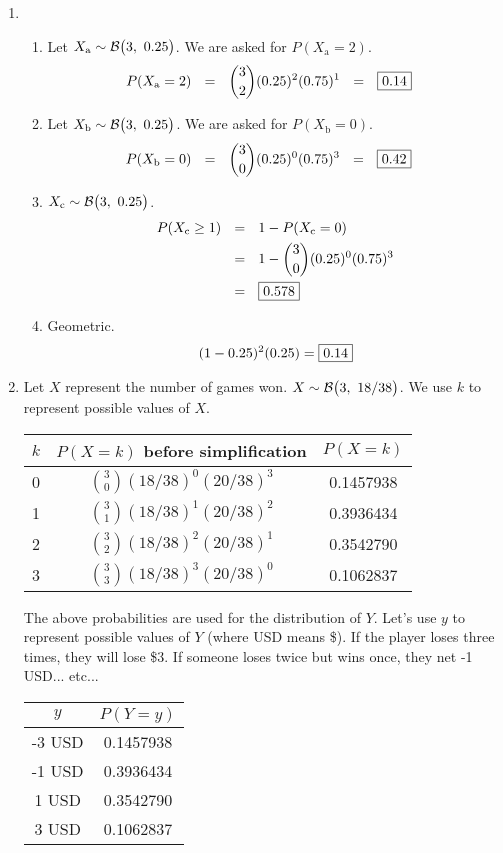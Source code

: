 \documentclass[12pt,letterpaper]{article}
\begin{document}
\begin{enumerate}
\newpage

\item \begin{enumerate}
\item Let $X_\text{a} \sim \mathcal{B}\big(3,~0.25\big)$. We are asked for $P(X_\text{a} = 2)$.
\begin{align*}
P(X_\text{a} = 2) ~~&=~~ {3\choose 2}(0.25)^2(0.75)^{1} ~~=~~ \fbox{0.14}
\end{align*}
\item Let $X_\text{b} \sim \mathcal{B}\big(3,~0.25\big)$. We are asked for $P(X_\text{b} = 0)$.
\begin{align*}
P(X_\text{b} = 0) ~~&=~~ {3\choose 0}(0.25)^0(0.75)^{3} ~~=~~ \fbox{0.42}
\end{align*}
\item $X_\text{c} \sim \mathcal{B}\big(3,~0.25\big)$. 
\begin{align*}
P(X_\text{c} \ge 1) ~~&=~~ 1-P(X_\text{c} = 0) \\
&=~~ 1-{3\choose 0}(0.25)^0(0.75)^{3} \\
&=~~ \fbox{0.578}
\end{align*}
\item Geometric.
$$(1-0.25)^2(0.25) = \fbox{0.14} $$
\end{enumerate}


\item Let $X$ represent the number of games won. $X\sim \mathcal{B}\big(3,~18/38\big)$. We use $k$ to represent possible values of $X$.
\begin{center}
\renewcommand{\arraystretch}{1.8}
\begin{tabular}{|c|c|c|}\hline
$k$ & $P(X=k)$ before simplification & $P(X=k)$ \\ \hline
0  & ${3\choose 0} (18/38)^{0} (20/38)^3$ &  0.1457938 \\
1  & ${3\choose 1} (18/38)^{1} (20/38)^2$ & 0.3936434  \\
2  & ${3\choose 2} (18/38)^{2} (20/38)^1$ &  0.3542790 \\
3  & ${3\choose 3} (18/38)^{3} (20/38)^0$ &  0.1062837 \\ \hline
\end{tabular}
\end{center}
The above probabilities are used for the distribution of $Y$. Let's use $y$ to represent possible values of $Y$ (where USD means \$). If the player loses three times, they will lose \$3. If someone loses twice but wins once, they net -1 USD... etc...
\begin{center}
\renewcommand{\arraystretch}{1.8}
\begin{tabular}{|c|c|}\hline
$y$ & $P(Y=y)$ \\ \hline
-3 USD &  0.1457938 \\
-1 USD&  0.3936434  \\
1 USD&  0.3542790 \\
3 USD&  0.1062837 \\ \hline
\end{tabular}
\end{center}


\end{enumerate}
\end{document}
